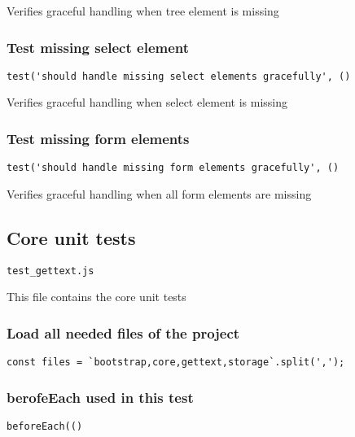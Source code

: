 \documentclass[a4paper]{article}
\begin{document}
Verifies graceful handling when tree element is missing

\hypertarget{toc613}{}
\subsubsection{Test missing select element}

\begin{lstlisting}
test('should handle missing select elements gracefully', ()
\end{lstlisting}

Verifies graceful handling when select element is missing

\hypertarget{toc614}{}
\subsubsection{Test missing form elements}

\begin{lstlisting}
test('should handle missing form elements gracefully', ()
\end{lstlisting}

Verifies graceful handling when all form elements are missing

\hypertarget{toc615}{}
\subsection{Core unit tests}

\begin{lstlisting}
test_gettext.js
\end{lstlisting}

This file contains the core unit tests

\hypertarget{toc616}{}
\subsubsection{Load all needed files of the project}

\begin{lstlisting}
const files = `bootstrap,core,gettext,storage`.split(',');
\end{lstlisting}

\hypertarget{toc617}{}
\subsubsection{berofeEach used in this test}

\begin{lstlisting}
beforeEach(()
\end{lstlisting}
\end{document}
